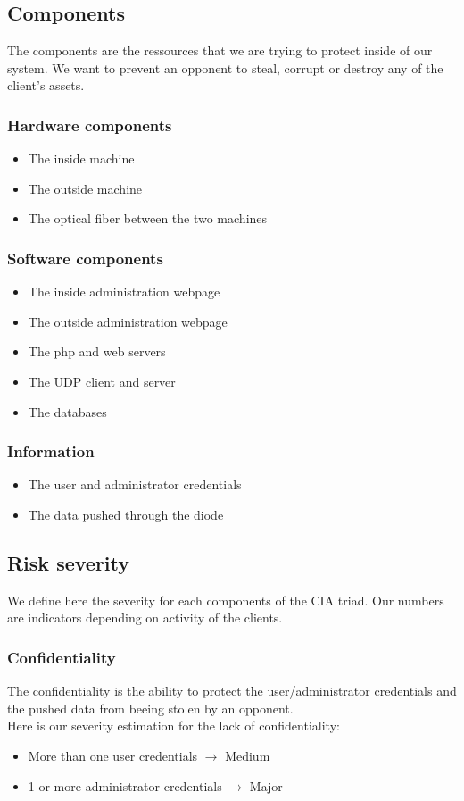 \documentclass[a4paper,11pt]{article}
\begin{document}
\subsection{Components}
The components are the ressources that we are trying to protect inside of our system. We want to prevent an opponent to steal, corrupt or destroy any of the client's assets.
\subsubsection{Hardware components}
\begin{itemize}
\item The inside machine
\item The outside machine
\item The optical fiber between the two machines
\end{itemize}
\subsubsection{Software components}
\begin{itemize}
\item The inside administration webpage
\item The outside administration webpage
\item The php and web servers
\item The UDP client and server
\item The databases
\end{itemize}
\subsubsection{Information}
\begin{itemize}
\item The user and administrator credentials
\item The data pushed through the diode
\end{itemize}
\subsection{Risk severity}
We define here the severity for each components of the CIA triad. Our numbers are indicators depending on activity of the clients.
\subsubsection{Confidentiality}
The confidentiality is the ability to protect the user/administrator credentials and the pushed data from beeing stolen by an opponent.\\
Here is our severity estimation for the lack of confidentiality:
\begin{itemize}
\item More than one user credentials $\rightarrow$ Medium
\item 1 or more administrator credentials $\rightarrow$ Major
\end{itemize}
\end{document}
